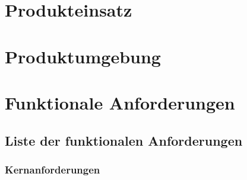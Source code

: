 \documentclass[a4paper,12pt]{article}
\begin{document}
\section{Produkteinsatz}

\section{Produktumgebung}

\section{Funktionale Anforderungen}
\subsection{Liste der funktionalen Anforderungen}

\subsubsection{Kernanforderungen} %
\end{document}
